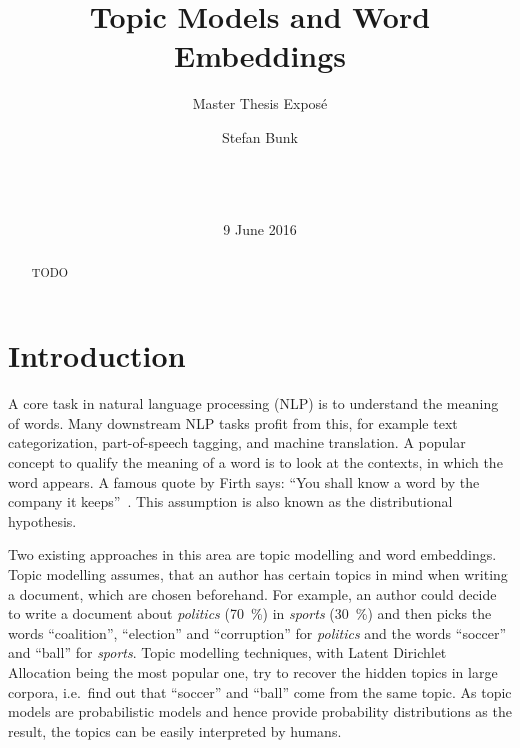 \documentclass{sig-alternate-05-2015}
\begin{document}
\title{Topic Models and Word Embeddings}
\subtitle{Master Thesis Expos\'e}

\author{
\alignauthor
Stefan Bunk\\
       \\
       \\
       \\
}
\date{9 June 2016}

\maketitle
\begin{abstract}
TODO
\end{abstract}

\section{Introduction}
A core task in natural language processing (NLP) is to understand the meaning of words.
Many downstream NLP tasks profit from this, for example text categorization, part-of-speech tagging, and machine translation.
A popular concept to qualify the meaning of a word is to look at the contexts, in which the word appears.
A famous quote by Firth says: ``You shall know a word by the company it keeps''~\cite{Firth1957}.
This assumption is also known as the distributional hypothesis.

Two existing approaches in this area are topic modelling and word embeddings.
Topic modelling assumes, that an author has certain topics in mind when writing a document, which are chosen beforehand.
For example, an author could decide to write a document about \emph{politics} (70~\%) in \emph{sports} (30~\%) and then picks the words ``coalition'', ``election'' and ``corruption'' for \emph{politics} and the words ``soccer'' and ``ball'' for \emph{sports}.
Topic modelling techniques, with Latent Dirichlet Allocation being the most popular one, try to recover the hidden topics in large corpora, i.e.\ find out that ``soccer'' and ``ball'' come from the same topic.
As topic models are probabilistic models and hence provide probability distributions as the result, the topics can be easily interpreted by humans.
\end{document}
